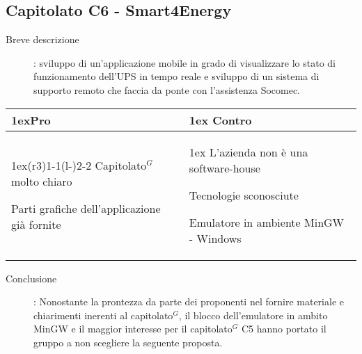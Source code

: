 \subsection{Capitolato C6 - Smart4Energy}
\begin{description}
\item [Breve descrizione]: sviluppo di un’applicazione mobile in grado di visualizzare lo stato di funzionamento dell'UPS in tempo reale e sviluppo di un sistema di supporto remoto che faccia da ponte con l'assistenza Socomec.
\end{description}
\begin{table}[h]
\begin{tabularx}{\linewidth}{>{\parskip1ex}X@{\kern4\tabcolsep}>{\parskip1ex}X}
\hfil\bfseries Pro
&
\hfil\bfseries Contro
\\\cmidrule(r{3\tabcolsep}){1-1}\cmidrule(l{-\tabcolsep}){2-2}
Capitolato$^{G}$ molto chiaro \par
Parti grafiche dell'applicazione già fornite
&
L'azienda non è una software-house \par
Tecnologie sconosciute \par
Emulatore in ambiente MinGW - Windows \\
\end{tabularx}
\end{table}
\begin{description}
	\item [Conclusione]: Nonostante la prontezza da parte dei proponenti nel fornire materiale e chiarimenti inerenti al capitolato$^{G}$, il blocco dell'emulatore in ambito MinGW e il maggior interesse per il capitolato$^{G}$ C5 hanno portato il gruppo a non scegliere la seguente proposta.
\end{description}
